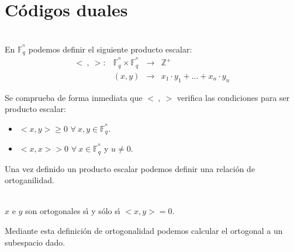 %
%

%
\newpage
%
\section{C\'odigos duales}

\begin{definicion}
\ \\
En $\mathbb{F}^{^n}_q$ podemos definir el siguiente producto escalar:
\begin{displaymath}
\begin{array}{cccl}
<\ ,\ >:&\mathbb{F}^{^n}_q\times\mathbb{F}^{^n}_q&\longrightarrow&\mathbb{Z}^+\\
&(x,y)&\longrightarrow& x_1\cdot y_1+\dots+x_n\cdot y_n
\end{array}
\end{displaymath}
\end{definicion}
Se comprueba de forma inmediata que $<\ ,\ >$ verifica las condiciones para ser
producto escalar:
\begin{itemize}
\item $<x,y>\geq 0$ $\forall \ x,y\in \mathbb{F}^{^n}_q$.
\item $<x,x> > 0$ $\forall \ x\in \mathbb{F}^{^n}_q$ y $u\neq 0$.
\end{itemize}

Una vez definido un producto escalar podemos definir una relaci\'on de
ortoganilidad.
\begin{definicion}
\ \\
$x$ e $y$ son ortogonales s\'{\i} y s\'olo s\'{\i} $<x,y>=0$.
\end{definicion}
Mediante esta definici\'on de ortogonalidad podemos calcular el ortogonal a
un subespacio dado.\\


